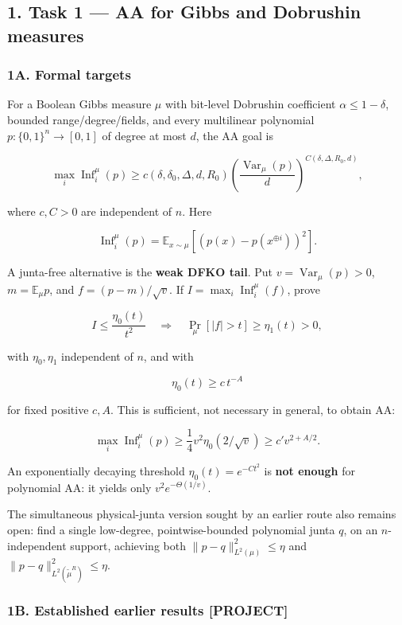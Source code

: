 \subsection{1. Task 1 --- AA for Gibbs and Dobrushin measures}\label{task-1-aa-for-gibbs-and-dobrushin-measures}

\subsubsection{1A. Formal targets}\label{a.-formal-targets}

For a Boolean Gibbs measure \(\mu\) with bit-level Dobrushin coefficient \(\alpha\le1-\delta\), bounded range/degree/fields, and every multilinear polynomial \(p:\{0,1\}^n\to[0,1]\) of degree at most \(d\), the AA goal is

\[
\max_i\operatorname{Inf}_i^\mu(p)
\ge c(\delta,\delta_0,\Delta,d,R_0)
\left(\frac{\operatorname{Var}_\mu(p)}d\right)^{C(\delta,\Delta,R_0,d)},
\]

where \(c,C>0\) are independent of \(n\). Here

\[\operatorname{Inf}_i^\mu(p)=\mathbb E_{x\sim\mu}[(p(x)-p(x^{\oplus i}))^2].\]

A junta-free alternative is the \textbf{weak DFKO tail}. Put \(v=\operatorname{Var}_\mu(p)>0\), \(m=\mathbb E_\mu p\), and \(f=(p-m)/\sqrt v\). If \(I=\max_i\operatorname{Inf}_i^\mu(f)\), prove

\[I\le\frac{\eta_0(t)}{t^2}
\quad\Longrightarrow\quad
\Pr_\mu[|f|>t]\ge\eta_1(t)>0,\]

with \(\eta_0,\eta_1\) independent of \(n\), and with

\[\eta_0(t)\ge c\,t^{-A}\]

for fixed positive \(c,A\). This is sufficient, not necessary in general, to obtain AA:

\[\max_i\operatorname{Inf}_i^\mu(p)
\ge \frac14v^2\eta_0(2/\sqrt v)
\ge c'v^{2+A/2}.\]

An exponentially decaying threshold \(\eta_0(t)=e^{-Ct^2}\) is \textbf{not enough} for polynomial AA: it yields only \(v^2e^{-\Theta(1/v)}\).

The simultaneous physical-junta version sought by an earlier route also remains open: find a single low-degree, pointwise-bounded polynomial junta \(q\), on an \(n\)-independent support, achieving both \(\|p-q\|_{L^2(\mu)}^2\le\eta\) and \(\|p-q\|_{L^2(\widetilde{\mu}^R)}^2\le\eta\).

\subsubsection{1B. Established earlier results {[}PROJECT{]}}\label{b.-established-earlier-results-project}

